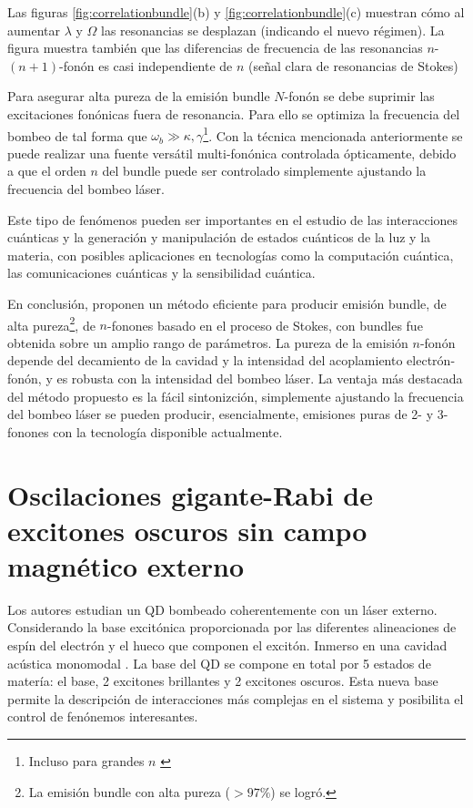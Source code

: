 \documentclass[main.tex]{subfiles}
\begin{document}
Las figuras \ref{fig:correlationbundle}(b) y \ref{fig:correlationbundle}(c) muestran cómo al aumentar $\lambda$ y $\Omega$ las resonancias se desplazan (indicando el nuevo régimen). La figura muestra también que las diferencias de frecuencia de las resonancias $n$- $(n+1)$-fonón es casi independiente de $n$ (señal clara de resonancias de Stokes)

Para asegurar alta pureza de la emisión bundle $N$-fonón se debe suprimir las excitaciones fonónicas fuera de resonancia. Para ello se optimiza la frecuencia del bombeo de tal forma que $\omega_b \gg \kappa, \gamma$\footnote{Incluso para grandes $n$ \parencite{Bin2020}}. Con la técnica mencionada anteriormente se puede realizar una fuente versátil multi-fonónica controlada ópticamente, debido a que el orden $n$ del bundle puede ser controlado simplemente ajustando la frecuencia del bombeo láser.

Este tipo de fenómenos pueden ser importantes en el estudio de las interacciones cuánticas y la generación y manipulación de estados cuánticos de la luz y la materia, con posibles aplicaciones en tecnologías como la computación cuántica, las comunicaciones cuánticas y la sensibilidad cuántica.

En conclusión, proponen un método eficiente para producir emisión bundle, de alta pureza\footnote{La emisión bundle con alta pureza ($>97\%$) se logró.}, de $n$-fonones basado en el proceso de Stokes, con bundles  fue obtenida sobre un amplio rango de parámetros. La pureza de la emisión $n$-fonón depende del decamiento de la cavidad y la intensidad del acoplamiento electrón-fonón, y es robusta con la intensidad del bombeo láser. La ventaja más destacada del método propuesto es la fácil sintonizción, simplemente ajustando la frecuencia del bombeo láser se pueden producir, esencialmente, emisiones puras de 2- y 3-fonones con la tecnología disponible actualmente.

%
\section[Oscilaciones gigante-Rabi de excitones oscuros sin campo magnético ...]{Oscilaciones gigante-Rabi de excitones oscuros sin campo magnético externo}\label{sec:giant-Rabi}
Los autores \parencite{Vargas2022} estudian un QD bombeado coherentemente con un láser externo. Considerando la base excitónica proporcionada por las diferentes alineaciones de espín del electrón y el hueco que componen el excitón. Inmerso en una cavidad acústica monomodal \parencite{Weib2018}. La base del QD se compone en total por 5 estados de matería: el base, 2 excitones brillantes y 2 excitones oscuros. Esta nueva base permite la descripción de interacciones más complejas en el sistema y posibilita el control de fenónemos interesantes.
\end{document}
